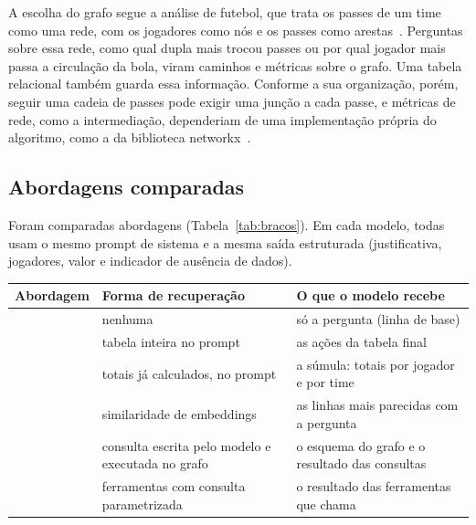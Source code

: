 A escolha do grafo segue a análise de futebol, que trata os passes de um time como uma rede, com os jogadores como
nós e os passes como arestas~\cite{buldu2018using,duch2010quantifying}. Perguntas sobre essa rede, como qual dupla %
mais trocou passes ou por qual jogador mais passa a circulação da bola, viram caminhos e métricas sobre o grafo. Uma tabela relacional também guarda essa informação. Conforme a sua organização, porém, seguir uma cadeia de passes pode exigir uma junção a cada passe, e métricas de rede, como a intermediação, dependeriam de uma implementação própria do algoritmo, como a da biblioteca networkx~\cite{networkx}.





\subsection{Abordagens comparadas}\label{sec:arquiteturas}

Foram comparadas \nArms{} abordagens (Tabela~\ref{tab:bracos}). Em cada modelo,
todas usam o mesmo prompt de sistema e a mesma saída estruturada (justificativa, jogadores, valor e indicador de
ausência de dados).

\vspace{2mm}
\noindent\begin{minipage}{\columnwidth}
\centering\small\renewcommand{\arraystretch}{1.15}\setlength{\tabcolsep}{4pt}
\begin{tabular}{>{\raggedright\arraybackslash}p{}>{\raggedright\arraybackslash}p{}>{\raggedright\arraybackslash}p{}} %
\toprule
Abordagem & Forma de recuperação & O que o modelo recebe \\
\midrule
\armNoContext{} & nenhuma & só a pergunta (linha de base) \\
\armEventsInPrompt{} & tabela inteira no prompt & as \nActions{} ações da tabela final \\
\armStatsInPrompt{} & totais já calculados, no prompt & a súmula: totais por jogador e por time \\
\armVector{} & similaridade de embeddings & as \nTopK{} linhas mais parecidas com a pergunta \\
\armTextToCypher{} & consulta escrita pelo modelo e executada no grafo & o esquema do grafo e o resultado das consultas \\
\armGraphTools{} & \nTools{} ferramentas com consulta parametrizada & o resultado das ferramentas que chama \\
\bottomrule
\end{tabular}
\label{tab:bracos}
\end{minipage}\par\smallskip

